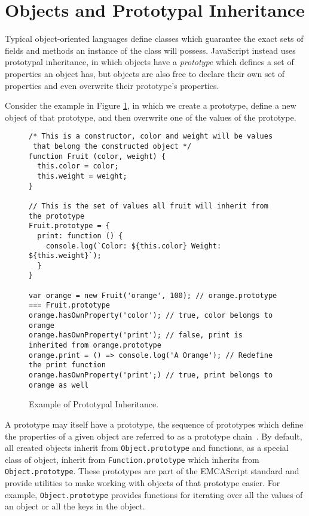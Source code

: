 \documentclass[]{final_report}
\begin{document}
\section{Objects and Prototypal Inheritance}
Typical object-oriented languages define classes which guarantee the exact sets of fields and methods an instance of the class will possess. JavaScript instead uses prototypal inheritance, in which objects have a \textit{prototype} which defines  a set of properties an object has, but objects are also free to declare their own set of properties and even overwrite their prototype's properties. 

Consider the example in Figure \ref{fig:js-prototypical-inheritance}, in which we create a prototype, define a new object of that prototype, and then overwrite one of the values of the prototype.

\begin{figure}[t]
\begin{lstlisting}
/* This is a constructor, color and weight will be values
 that belong the constructed object */
function Fruit (color, weight) {
  this.color = color;
  this.weight = weight;
}

// This is the set of values all fruit will inherit from the prototype
Fruit.prototype = {
  print: function () {
    console.log(`Color: ${this.color} Weight: ${this.weight}`);
  }
}

var orange = new Fruit('orange', 100); // orange.prototype === Fruit.prototype
orange.hasOwnProperty('color'); // true, color belongs to orange
orange.hasOwnProperty('print'); // false, print is inherited from orange.prototype
orange.print = () => console.log('A Orange'); // Redefine the print function
orange.hasOwnProperty('print';) // true, print belongs to orange as well
\end{lstlisting}
\caption{\label{fig:js-prototypical-inheritance} Example of Prototypal Inheritance.}
\end{figure} 

A prototype may itself have a prototype, the sequence of prototypes which define the properties of a given object are referred to as a prototype chain~\cite{EcmaScript, borning1986classes}. By default, all created objects inherit from \lstinline{Object.prototype} and functions, as a special class of object, inherit from \lstinline{Function.prototype} which inherits from \lstinline{Object.prototype}. These prototypes are part of the EMCAScript standard and provide utilities to make working with objects of that prototype easier. For example, \lstinline{Object.prototype} provides functions for iterating over all the values of an object or all the keys in the object.
\end{document}
